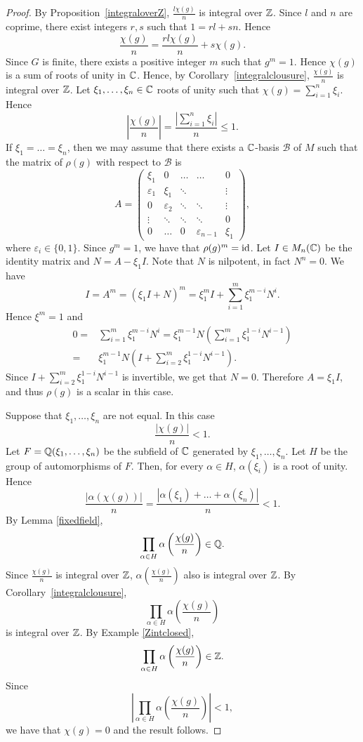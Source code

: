 \begin{proof}
By Proposition~\ref{integraloverZ}, $\frac{l\chi(g)}{n}$ is integral over $\mathbb{Z}$. Since $l$ and $n$ are coprime, there exist integers
$r,s$ such that $1=rl+sn$. Hence
\[ \frac{\chi(g)}{n}=\frac{rl\chi(g)}{n}+s\chi(g).\]
Since $G$ is finite, there exists a positive integer $m$ such that $g^m=1$. Hence $\chi(g)$ is a sum of roots of unity in $\mathbb{C}$.
Hence, by Corollary~\ref{integralclousure}, $\frac{\chi(g)}{n}$ is integral over $\mathbb{Z}$. Let $\xi_1,\dots ,\xi_n\in\mathbb{C}$ roots of unity
such that $\chi(g)=\sum_{i=1}^n\xi_i$. Hence
\[\left|\frac{\chi(g)}{n}\right|=\frac{\left|\sum_{i=1}^n\xi_i\right|}{n}\leq 1.\]
If $\xi_1=\dots =\xi_n$, then we may assume that there exists a $\mathbb{C}$-basis $\mathcal{B}$ of $M$ such that the matrix of 
$\rho(g)$ with respect to $\mathcal{B}$ is
\[ A=\left(\begin{array}{ccccc}
\xi_1&0&\ldots&\ldots&0\\
\varepsilon_1&\xi_1&\ddots&&\vdots\\
0&\varepsilon_2&\ddots&\ddots&\vdots\\
\vdots&\ddots&\ddots&\ddots&0\\
0&\ldots&0&\varepsilon_{n-1}&\xi_1\end{array}\right),\]
where $\varepsilon_i\in\{ 0,1\}$. Since 
$g^m=1$, we have that $\rho(g)^m=\operatorname{id}$. Let $I\in M_n(\mathbb{C})$ be the identity matrix and $N=A-\xi_1I$. 
Note that $N$ is nilpotent, in fact $N^n=0$. We have
\[ I=A^m=(\xi_1I+N)^m=\xi_1^mI+\sum_{i=1}^m\xi_1^{m-i}N^{i}.
\]
Hence $\xi^m=1$ and
\begin{align*}
    0=&\sum_{i=1}^m\xi_1^{m-i}N^{i}=\xi_1^{m-1}N\left(\sum_{i=1}^m\xi_1^{1-i}N^{i-1}\right)\\
    =&\xi_1^{m-1}N\left( I+\sum_{i=2}^m\xi_1^{1-i}N^{i-1}\right).
\end{align*}
Since $ I+\sum_{i=2}^m\xi_1^{1-i}N^{i-1}$ is invertible, we get that $N=0$. Therefore $A=\xi_1I$, and thus $\rho(g)$ is a scalar in this case.

Suppose that $\xi_1,\dots ,\xi_n$ are not equal. In this case
\[\frac{|\chi(g)|}{n}<1.\]
Let $F=\mathbb{Q}(\xi_1,\dots ,\xi_n)$ be the subfield of $\mathbb{C}$ generated by $\xi_1,\dots ,\xi_n$. Let $H$ be the group of automorphisms of $F$.
Then, for every $\alpha\in H$, $\alpha(\xi_i)$ is a root of unity. Hence
\[\frac{|\alpha(\chi(g))|}{n}=\frac{|\alpha(\xi_1)+\dots +\alpha(\xi_n)|}{n}<1.\]
By Lemma \ref{fixedfield}, 
\[\prod_{\alpha\in H}\alpha\left(\frac{\chi(g)}{n}\right)\in \mathbb{Q}.\]
Since $\frac{\chi(g)}{n}$ is integral over $\mathbb{Z}$, $\alpha\left(\frac{\chi(g)}{n}\right)$ also is integral over $\mathbb{Z}$. By Corollary~\ref{integralclousure},  
\[\prod_{\alpha\in H}\alpha\left(\frac{\chi(g)}{n}\right)\]
is integral over $\mathbb{Z}$. By Example \ref{Zintclosed}, 
\[\prod_{\alpha\in H}\alpha\left(\frac{\chi(g)}{n}\right)\in\mathbb{Z}.\]
Since
\[\left|\prod_{\alpha\in H}\alpha\left(\frac{\chi(g)}{n}\right)\right|<1,\]
we have that $\chi(g)=0$ and the result follows.
\end{proof}


